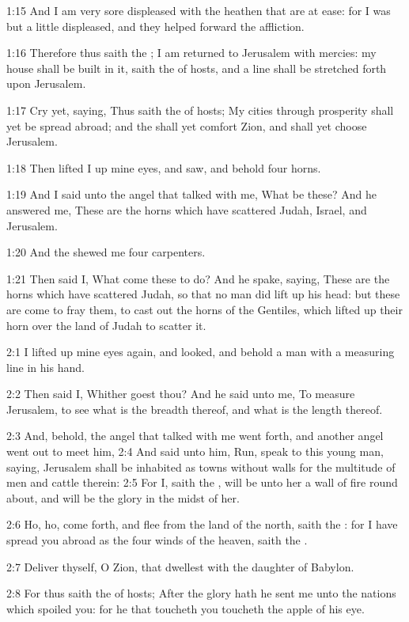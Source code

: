 1:15 And I am very sore displeased with the heathen that are at ease: for I was but a little displeased, and they helped forward the affliction.

1:16 Therefore thus saith the \LORD; I am returned to Jerusalem with mercies: my house shall be built in it, saith the \LORD of hosts, and a line shall be stretched forth upon Jerusalem.

1:17 Cry yet, saying, Thus saith the \LORD of hosts; My cities through prosperity shall yet be spread abroad; and the \LORD shall yet comfort Zion, and shall yet choose Jerusalem.

1:18 Then lifted I up mine eyes, and saw, and behold four horns.

1:19 And I said unto the angel that talked with me, What be these? And he answered me, These are the horns which have scattered Judah, Israel, and Jerusalem.

1:20 And the \LORD shewed me four carpenters.

1:21 Then said I, What come these to do? And he spake, saying, These are the horns which have scattered Judah, so that no man did lift up his head: but these are come to fray them, to cast out the horns of the Gentiles, which lifted up their horn over the land of Judah to scatter it.

2:1 I lifted up mine eyes again, and looked, and behold a man with a measuring line in his hand.

2:2 Then said I, Whither goest thou? And he said unto me, To measure Jerusalem, to see what is the breadth thereof, and what is the length thereof.

2:3 And, behold, the angel that talked with me went forth, and another angel went out to meet him, 2:4 And said unto him, Run, speak to this young man, saying, Jerusalem shall be inhabited as towns without walls for the multitude of men and cattle therein: 2:5 For I, saith the \LORD, will be unto her a wall of fire round about, and will be the glory in the midst of her.

2:6 Ho, ho, come forth, and flee from the land of the north, saith the \LORD: for I have spread you abroad as the four winds of the heaven, saith the \LORD.

2:7 Deliver thyself, O Zion, that dwellest with the daughter of Babylon.

2:8 For thus saith the \LORD of hosts; After the glory hath he sent me unto the nations which spoiled you: for he that toucheth you toucheth the apple of his eye.

